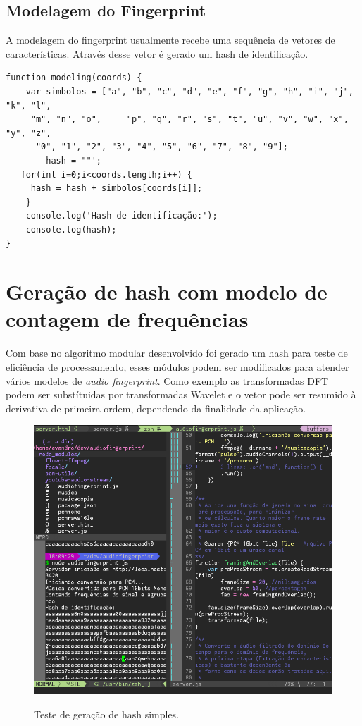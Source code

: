 \subsection{Modelagem do Fingerprint}
\label{ss.modelagemfingerprint}

A modelagem do fingerprint usualmente recebe uma sequência de vetores de características. Através desse vetor é gerado um hash de identificação.

\begin{verbatim}
function modeling(coords) {
    var simbolos = ["a", "b", "c", "d", "e", "f", "g", "h", "i", "j", "k", "l",
     "m", "n", "o",     "p", "q", "r", "s", "t", "u", "v", "w", "x", "y", "z",
      "0", "1", "2", "3", "4", "5", "6", "7", "8", "9"];
        hash = ""';
   for(int i=0;i<coords.length;i++) {
     hash = hash + simbolos[coords[i]];
    }
    console.log('Hash de identificação:');
    console.log(hash);
}
\end{verbatim}

\section{Geração de hash com modelo de contagem de frequências}
\label{s.teste}

Com base no algoritmo modular desenvolvido foi gerado um hash para teste de eficiência de processamento, esses módulos podem ser modificados para atender vários modelos de \emph{audio fingerprint}. Como exemplo as transformadas DFT podem ser substítuidas por transformadas Wavelet e o vetor pode ser resumido à derivativa de primeira ordem, dependendo da finalidade da aplicação.

\begin{figure}[h]
\caption{\small Teste de geração de hash simples.}
\centering
\includegraphics[scale=0.75]{figs/execucao.png}
\label{f.execucao}
\end{figure}

